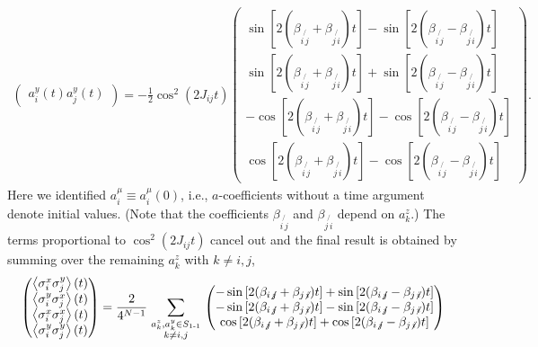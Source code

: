 \documentclass[aps,prl,showpacs,amsmath,amssymb,superscriptaddress,reprint,10pt]{revtex4-1}
\begin{document}
\begin{widetext}
\begin{subequations}
\begin{align}
\begin{pmatrix}
 a_i^y(t)a_j^y(t)
 \end{pmatrix}
=
 -\frac{1}{2}\cos^2(2J_{ij}t)\begin{pmatrix}
        \sin\left[2(\beta_{i\not{\,j}}+\beta_{j\not{\,i}})t\right]-\sin\left[2(\beta_{i\not{\,j}}-\beta_{j\not{\,i}})t\right]\\
        \sin\left[2(\beta_{i\not{\,j}}+\beta_{j\not{\,i}})t\right]+\sin\left[2(\beta_{i\not{\,j}}-\beta_{j\not{\,i}})t\right]\\
        -\cos\left[2(\beta_{i\not{\,j}}+\beta_{j\not{\,i}})t\right]-\cos\left[2(\beta_{i\not{\,j}}-\beta_{j\not{\,i}})t\right]\\
        \cos\left[2(\beta_{i\not{\,j}}+\beta_{j\not{\,i}})t\right]-\cos\left[2(\beta_{i\not{\,j}}-\beta_{j\not{\,i}})t\right]
       \end{pmatrix}.
\end{align}
\end{subequations}
Here we identified $a_i^\mu\equiv a_i^\mu(0)$, i.e., $a$-coefficients without a time argument denote initial values. (Note that the coefficients $\beta_{i\not{\,j}}$ and $\beta_{j\not{\,i}}$ depend on $a_k^z$.) The terms proportional to $\cos^2(2J_{ij}t)$ cancel out and the final result is obtained by summing over the remaining $a_k^z$ with $k\neq i,j$,
\begin{subequations}
\begin{align}
\begin{pmatrix}
        \left\langle\sigma_i^x\sigma_j^y\right\rangle(t)\\
        \left\langle\sigma_i^y\sigma_j^x\right\rangle(t)\\
        \left\langle\sigma_i^x\sigma_j^x\right\rangle(t)\\
        \left\langle\sigma_i^y\sigma_j^y\right\rangle(t)
       \end{pmatrix}    
 =\frac{2}{4^{N-1}}\sum_{\genfrac{}{}{0pt}{}{\scriptstyle a_k^z,a_k^y\in S_{\text{1-1}}}{\scriptstyle k\neq i,j}}%
\begin{pmatrix}
        -\sin\left[2(\beta_{i\not{\,j}}+\beta_{j\not{\,i}})t\right]+\sin\left[2(\beta_{i\not{\,j}}-\beta_{j\not{\,i}})t\right]\\
        -\sin\left[2(\beta_{i\not{\,j}}+\beta_{j\not{\,i}})t\right]-\sin\left[2(\beta_{i\not{\,j}}-\beta_{j\not{\,i}})t\right]\\
        \cos\left[2(\beta_{i\not{\,j}}+\beta_{j\not{\,i}})t\right]+\cos\left[2(\beta_{i\not{\,j}}-\beta_{j\not{\,i}})t\right]\\

\end{pmatrix}
\end{align}
\end{subequations}
\end{widetext}
\end{document}
